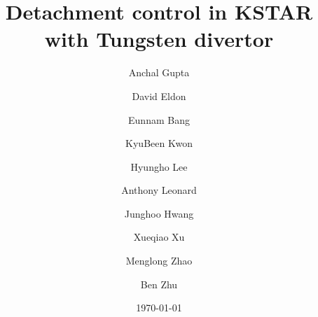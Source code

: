 \documentclass[final,5p,times]{elsarticle}  %
\begin{document}
\title{Detachment control in KSTAR with Tungsten divertor}
\author[ORAU]{Anchal Gupta}

\author[GA]{David Eldon}

\author[KFE]{Eunnam Bang}

\author[ORAU]{KyuBeen Kwon}

\author[KFE]{Hyungho Lee}

\author[GA]{Anthony Leonard}

\author[KFE]{Junghoo Hwang}

\author[LLNL]{Xueqiao Xu}

\author[LLNL]{Menglong Zhao}

\author[LLNL]{Ben Zhu}

\address[ORAU]{\ORAU}
\address[GA]{\GA}
\address[KFE]{\KFE}
\address[LLNL]{\LLNL}

\date{\today}



\acresetall  %

\maketitle




















\end{document}
